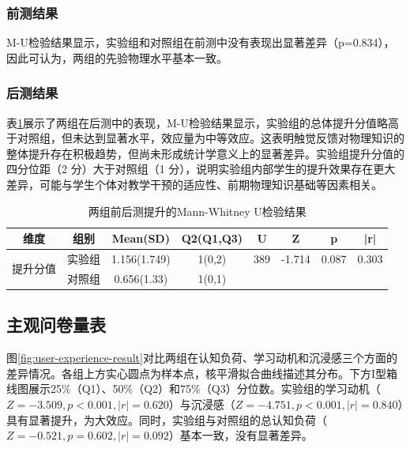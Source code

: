 \documentclass[runningheads]{llncs}
\begin{document}
\subsubsection{前测结果}
M-U检验结果显示，实验组和对照组在前测中没有表现出显著差异（p=0.834），因此可认为，两组的先验物理水平基本一致。

\subsubsection{后测结果}
表\ref{tab:learning-effect}展示了两组在后测中的表现，M-U检验结果显示，实验组的总体提升分值略高于对照组，但未达到显著水平，效应量为中等效应。这表明触觉反馈对物理知识的整体提升存在积极趋势，但尚未形成统计学意义上的显著差异。实验组提升分值的四分位距（2 分）大于对照组（1 分），说明实验组内部学生的提升效果存在更大差异，可能与学生个体对教学干预的适应性、前期物理知识基础等因素相关。

\begin{table}[t]
\centering
\setlength{\tabcolsep}{6pt} %
\caption{两组前后测提升的Mann-Whitney U检验结果}
\label{tab:learning-effect}
\begin{tabular}{cccccccc}
\toprule
\textbf{维度} & \textbf{组别} & \textbf{Mean(SD)} & \textbf{Q2(Q1,Q3)} & \textbf{U} & \textbf{Z} & \textbf{p} & \textbf{|r|} \\
\midrule
\multirow{2}{*}{提升分值} 
& 实验组 & 1.156(1.749) & 1(0,2) & 389 & -1.714 & 0.087 & 0.303 \\
& 对照组 & 0.656(1.33) & 1(0,1) &  &  &  &  \\
\bottomrule
\end{tabular}
\end{table}

\subsection{主观问卷量表}
图\ref{fig:user-experience-result}对比两组在认知负荷、学习动机和沉浸感三个方面的差异情况。各组上方实心圆点为样本点，核平滑拟合曲线描述其分布。下方I型箱线图展示25\%（Q1）、50\%（Q2）和75\%（Q3）分位数。实验组的学习动机（$Z=-3.509,p<0.001,|r|=0.620$）与沉浸感（$Z=-4.751,p<0.001,|r|=0.840$）具有显著提升，为大效应。同时，实验组与对照组的总认知负荷（$Z=-0.521,p=0.602,|r|=0.092$）基本一致，没有显著差异。
\end{document}
